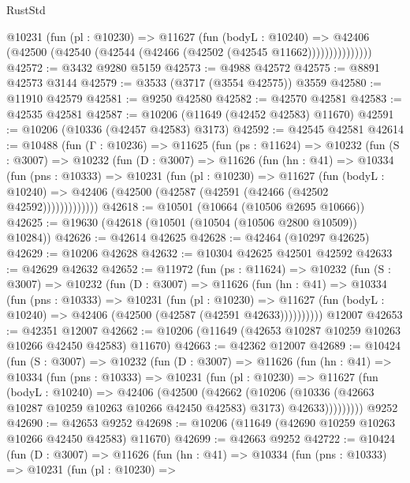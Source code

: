 \begin{lexlean}{RustStd}
\begin{coremodule}
                @10231
                  (fun (pl : @10230) =>
                  @11627
                    (fun (bodyL : @10240) =>
                    @42406 (@42500 (@42540 (@42544 (@42466 (@42502 (@42545 @11662)))))))))))))))
@42572 := @3432 @9280 @5159
@42573 := @4988 @42572
@42575 := @8891 @42573 @3144
@42579 := @3533 (@3717 (@3554 @42575)) @3559
@42580 := @11910 @42579
@42581 := @9250 @42580
@42582 := @42570 @42581
@42583 := @42535 @42581
@42587 := @10206 (@11649 (@42452 @42583) @11670)
@42591 := @10206 (@10336 (@42457 @42583) @3173)
@42592 := @42545 @42581
@42614 := @10488
    (fun (Γ : @10236) =>
    @11625
      (fun (ps : @11624) =>
      @10232
        (fun (S : @3007) =>
        @10232
          (fun (D : @3007) =>
          @11626
            (fun (hn : @41) =>
            @10334
              (fun (pns : @10333) =>
              @10231
                (fun (pl : @10230) =>
                @11627
                  (fun (bodyL : @10240) =>
                  @42406 (@42500 (@42587 (@42591 (@42466 (@42502 @42592)))))))))))))
@42618 := @10501 (@10664 (@10506 @2695 @10666))
@42625 := @19630 (@42618 (@10501 (@10504 (@10506 @2800 @10509)) @10284))
@42626 := @42614 @42625
@42628 := @42464 (@10297 @42625)
@42629 := @10206 @42628
@42632 := @10304 @42625 @42501 @42592
@42633 := @42629 @42632
@42652 := @11972
    (fun (ps : @11624) =>
    @10232
      (fun (S : @3007) =>
      @10232
        (fun (D : @3007) =>
        @11626
          (fun (hn : @41) =>
          @10334
            (fun (pns : @10333) =>
            @10231
              (fun (pl : @10230) =>
              @11627 (fun (bodyL : @10240) => @42406 (@42500 (@42587 (@42591 @42633))))))))))
    @12007
@42653 := @42351 @12007
@42662 := @10206 (@11649 (@42653 @10287 @10259 @10263 @10266 @42450 @42583) @11670)
@42663 := @42362 @12007
@42689 := @10424
    (fun (S : @3007) =>
    @10232
      (fun (D : @3007) =>
      @11626
        (fun (hn : @41) =>
        @10334
          (fun (pns : @10333) =>
          @10231
            (fun (pl : @10230) =>
            @11627
              (fun (bodyL : @10240) =>
              @42406
                (@42500
                  (@42662
                    (@10206
                      (@10336 (@42663 @10287 @10259 @10263 @10266 @42450 @42583) @3173)
                      @42633)))))))))
    @9252
@42690 := @42653 @9252
@42698 := @10206 (@11649 (@42690 @10259 @10263 @10266 @42450 @42583) @11670)
@42699 := @42663 @9252
@42722 := @10424
    (fun (D : @3007) =>
    @11626
      (fun (hn : @41) =>
      @10334
        (fun (pns : @10333) =>
        @10231
          (fun (pl : @10230) =>

\end{coremodule}
\end{lexlean}
